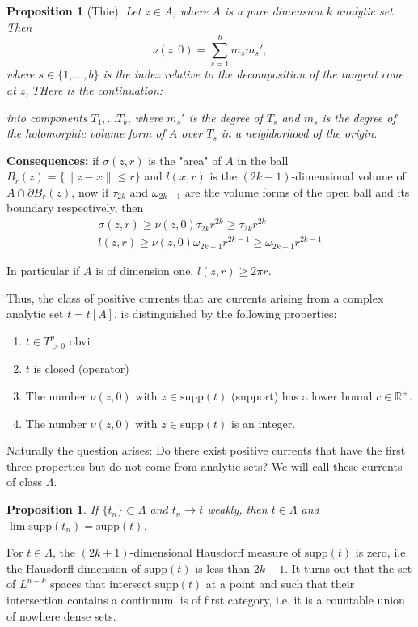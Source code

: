 \documentclass[12pt,twoside,a4paper]{report}
\newtheorem{prop}[theorem]{Proposition}
\begin{document}
\begin{prop}[Thie]\label{thie}
Let $z\in A$, where $A$ is a pure dimension $k$ analytic set. Then
\[
    \nu(z,0)=\sum^{b}_{s=1}m_{s} m_{s}',
\]
\noindent where $s\in\{1,\dots,b\}$ is the index relative to the decomposition of the tangent cone at $z$, $T$Here is the continuation:

into components $T_1, \dots T_b$, where $m_s'$ is the degree of $T_s$ and $m_s$ is the degree of the holomorphic volume form of $A$ over $T_s$ in a neighborhood of the origin.
\end{prop}

\textbf{Consequences:}
if $\sigma(z,r)$ is the "area" of $A$ in the ball $B_r(z)=\{\|z-x\|\leq r\}$ and $l(x,r)$ is the $(2k-1)$-dimensional volume of $A\cap\partial B_r(z)$, now if $\tau_{2k}$ and $\omega_{2k-1}$ are the volume forms of the open ball and its boundary respectively, then
\begin{align*}
\sigma(z,r)\geq\nu(z,0)\tau_{2k}r^{2k}\geq\tau_{2k}r^{2k}\\
l(z,r)\geq\nu(z,0)\omega_{2k-1}r^{2k-1}\geq\omega_{2k-1}r^{2k-1}
\end{align*}

\noindent In particular if $A$ is of dimension one, $l(z,r)\geq2\pi r$.

Thus, the class of positive currents that are currents arising from a complex analytic set $t=t[A]$, is distinguished by the following properties:
\begin{enumerate}
\item $t\in T^p_{>0}$ obvi
\item $t$ is closed (operator)
\item The number $\nu(z,0)$ with $z\in \mathrm{supp}(t)$ (support) has a lower bound $c\in\mathbb{R}^{+}$.
\item The number $\nu(z,0)$ with $z\in \mathrm{supp}(t)$ is an integer.
\end{enumerate}

Naturally the question arises: Do there exist positive currents that have the first three properties but do not come from analytic sets? We will call these currents of class $\Lambda$.

\begin{prop}
If $\{t_n\}\subset\Lambda$ and $t_n\rightarrow t$ weakly, then $t\in\Lambda$ and $\lim \mathrm{supp}(t_n)=\mathrm{supp}(t)$.
\end{prop}

For $t\in\Lambda$, the $(2k+1)$-dimensional Hausdorff measure of $\mathrm{supp}(t)$ is zero, i.e. the Hausdorff dimension of $\mathrm{supp}(t)$ is less than $2k+1$. It turns out that the set of $L^{n-k}$ spaces that intersect $\mathrm{supp}(t)$ at a point and such that their intersection contains a continuum, is of first category, i.e. it is a countable union of nowhere dense sets.
\end{document}
